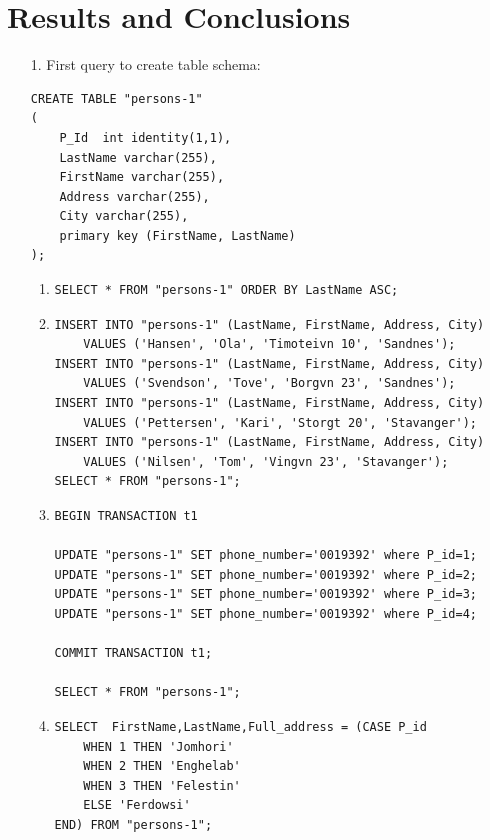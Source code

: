 \documentclass{article}
\begin{document}
\section{Results and Conclusions}
\begin{enumerate}
	\item[1.]
		First query to create table schema:
		\begin{verbatim}
CREATE TABLE "persons-1"
(
	P_Id  int identity(1,1),
	LastName varchar(255),
	FirstName varchar(255),
	Address varchar(255),
	City varchar(255),
	primary key (FirstName, LastName)
);
		\end{verbatim}
		\begin{enumerate}
			\item
				\begin{verbatim}
SELECT * FROM "persons-1" ORDER BY LastName ASC;
    				\end{verbatim}
    			\item
    				\begin{verbatim}
INSERT INTO "persons-1" (LastName, FirstName, Address, City)
	VALUES ('Hansen', 'Ola', 'Timoteivn 10', 'Sandnes');
INSERT INTO "persons-1" (LastName, FirstName, Address, City)
	VALUES ('Svendson', 'Tove', 'Borgvn 23', 'Sandnes');
INSERT INTO "persons-1" (LastName, FirstName, Address, City)
	VALUES ('Pettersen', 'Kari', 'Storgt 20', 'Stavanger');
INSERT INTO "persons-1" (LastName, FirstName, Address, City)
	VALUES ('Nilsen', 'Tom', 'Vingvn 23', 'Stavanger');
SELECT * FROM "persons-1";
   				\end{verbatim}
    			\item
				\begin{verbatim}
BEGIN TRANSACTION t1

UPDATE "persons-1" SET phone_number='0019392' where P_id=1;
UPDATE "persons-1" SET phone_number='0019392' where P_id=2;
UPDATE "persons-1" SET phone_number='0019392' where P_id=3;
UPDATE "persons-1" SET phone_number='0019392' where P_id=4;

COMMIT TRANSACTION t1;

SELECT * FROM "persons-1";
				\end{verbatim}

    			\item

    				\begin{verbatim}
SELECT  FirstName,LastName,Full_address = (CASE P_id
	WHEN 1 THEN 'Jomhori'
	WHEN 2 THEN 'Enghelab'
	WHEN 3 THEN 'Felestin'
	ELSE 'Ferdowsi'
END) FROM "persons-1";
    				\end{verbatim}


\end{enumerate}
\end{enumerate}
\end{document}
